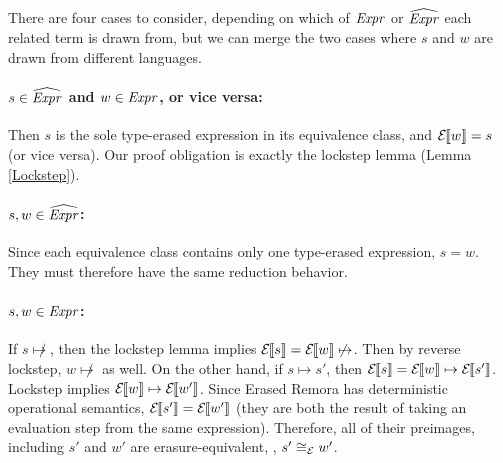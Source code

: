 \begin{sproof}[\BODY]
  There are four cases to consider,
  depending on which of $\mathit{Expr}$ or $\widehat{\mathit{Expr}}$ each related term is drawn from,
  but we can merge the two cases where $s$ and $w$ are drawn from different languages.

  \paragraph{$s \in \widehat{\mathit{Expr}}$ and $w \in \mathit{Expr}$, or vice versa:}
  Then $s$ is the sole type-erased expression in its equivalence class,
  and $\mathcal{E}{\hskip-.25em}\left\llbracket w \right\rrbracket = s$
  (or vice versa).
  Our proof obligation is exactly the lockstep lemma (Lemma \ref{Lockstep}).

  \paragraph{$s, w \in \widehat{\mathit{Expr}}$:}
  Since each equivalence class contains only one type-erased expression, $s = w$.
  They must therefore have the same reduction behavior.

  \paragraph{$s, w \in \mathit{Expr}$:}
  If $s \not\mapsto$, then the lockstep lemma implies $\mathcal{E}{\hskip-.25em}\left\llbracket s \right\rrbracket = \mathcal{E}{\hskip-.25em}\left\llbracket w \right\rrbracket \not\mapsto$.
  Then by reverse lockstep, $w \not\mapsto$ as well.
  On the other hand, if $s \mapsto s'$, then $\mathcal{E}{\hskip-.25em}\left\llbracket s \right\rrbracket = \mathcal{E}{\hskip-.25em}\left\llbracket w \right\rrbracket \mapsto \mathcal{E}{\hskip-.25em}\left\llbracket s' \right\rrbracket$.
  Lockstep implies $\mathcal{E}{\hskip-.25em}\left\llbracket w \right\rrbracket \mapsto \mathcal{E}{\hskip-.25em}\left\llbracket w' \right\rrbracket$.
  Since Erased Remora has deterministic operational semantics,
  $\mathcal{E}{\hskip-.25em}\left\llbracket s' \right\rrbracket = \mathcal{E}{\hskip-.25em}\left\llbracket w' \right\rrbracket$
  (they are both the result of taking an evaluation step from the same expression).
  Therefore, all of their preimages, including $s'$ and $w'$ are erasure-equivalent,
  \ie, $s' \cong_{\mathcal{E}} w'$.
\end{sproof}

